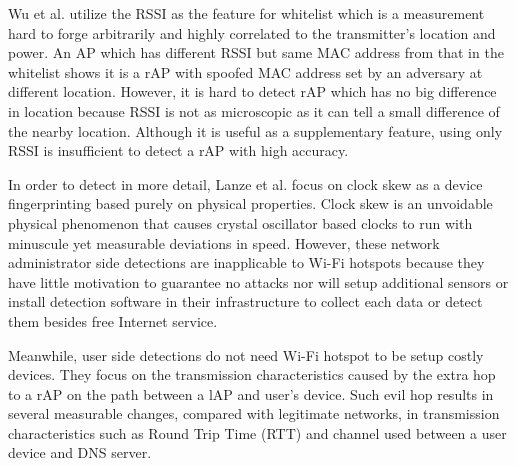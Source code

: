 \documentclass[conference]{IEEEtran}
\begin{document}
Wu et al. \cite{prapd} utilize the RSSI as the feature for whitelist which is a measurement hard to forge arbitrarily and highly correlated to the transmitter's location and power. 
An AP which has different RSSI but same MAC address from that in the whitelist shows it is a rAP with spoofed MAC address set by an adversary at different location.
However, it is hard to detect rAP which has no big difference in location because RSSI is not as microscopic as it can tell a small difference of the nearby location. 
Although it is useful as a supplementary feature, using only RSSI is insufficient to detect a rAP with high accuracy.

In order to detect in more detail, Lanze et al. \cite{clockskew} focus on clock skew as a device fingerprinting based purely on physical properties.
Clock skew is an unvoidable physical phenomenon that causes crystal oscillator based clocks to run with minuscule yet measurable deviations in speed.
However, these network administrator side detections are inapplicable to Wi-Fi hotspots because they have little motivation to guarantee no attacks nor will setup additional sensors or install detection software in their infrastructure to collect each data or detect them besides free Internet service.

Meanwhile, user side detections do not need Wi-Fi hotspot to be setup costly devices. 
They focus on the transmission characteristics caused by the extra hop to a rAP on the path between a lAP and user's device. 
Such evil hop results in several measurable changes, compared with legitimate networks, in transmission characteristics such as Round Trip Time (RTT) and channel used between a user device and DNS server.
\end{document}
